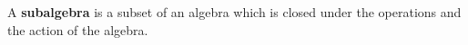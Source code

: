 \begin{definition}[Subalgebra]
	A \textbf{subalgebra} is a subset of an algebra which is closed under the operations and the action of the algebra.
\end{definition}
